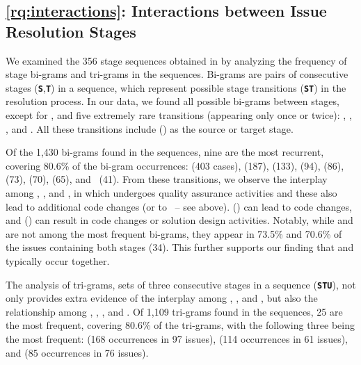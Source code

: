 


\subsection{\ref{rq:interactions}: Interactions between Issue Resolution Stages}
\label{sub:results_interactions}
We examined the 356 stage sequences obtained in  by analyzing the frequency of stage bi-grams and tri-grams in the sequences.
Bi-grams are pairs of consecutive stages (\texttt{\textbf{S}},\texttt{\textbf{T}}) in a sequence, which represent possible stage transitions (\texttt{\textbf{S}}\trs\texttt{\textbf{T}}) in the resolution process. In our data, we found all possible bi-grams between stages, except for  \crvs \trs \irs, and five extremely rare transitions (appearing only once or twice): \impls \trs \irs, \vers \trs \irs, \irs \trs \crvs, and \irs \trs \vers. All these transitions include \ir (\irs) as the source or target stage.

Of the 1,430 bi-grams found in the sequences, nine are the most recurrent, covering 80.6\% of the bi-gram occurrences: \impls \trs \crvs (403 cases), \crvs \trs \impls (187), \sds \trs \impls (133), \crvs \trs \vers (94), \impls \trs \vers (86), \vers \trs \impls (73), \ias \trs \impls (70), \ias \trs \sds (65), and \crvs \trs \sds~(41). From these transitions, we observe the interplay among \impl, \crv, and \ver, in which \impl undergoes quality assurance activities and these also lead to additional code changes (or to \sd~-- see \crvs \trs \sds above). \sd (\sds) can lead to code changes, and \ia (\ias) can result in code changes or solution design activities. Notably, while \ias \trs \irs and \irs \trs \ias are not among the most frequent bi-grams, they appear in 73.5\% and 70.6\% of the issues containing both stages (34). This further supports our finding that \ia and \ir typically occur together.

The analysis of tri-grams, sets of three consecutive stages in a sequence (\texttt{\textbf{S}}\trs\texttt{\textbf{T}}\trs\texttt{\textbf{U}}), not only provides extra evidence of the interplay among \impl, \crv,  and \ver, but also the relationship among \ia, \sd, \impl, and \crv. Of 1,109 tri-grams found in the sequences, 25 are the most frequent, covering 80.6\% of the tri-grams, with the following three being the most frequent: \impls \trs \crvs \trs \impls (168 occurrences in 97 issues), \crvs \trs \impls \trs \crvs (114 occurrences in 61 issues), and \sds \trs \impls \trs \crvs (85 occurrences in 76 issues). 

